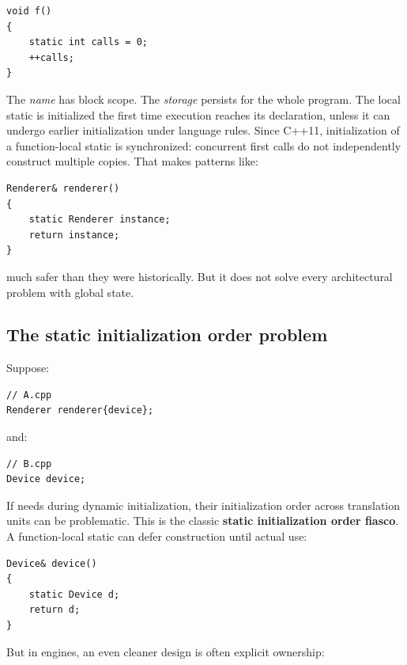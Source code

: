 \begin{verbatim}
void f()
{
    static int calls = 0;
    ++calls;
}
\end{verbatim}

The \emph{name}  has block scope. The \emph{storage} persists for the whole program. The local static is initialized the first time execution reaches its declaration, unless it can undergo earlier initialization under language rules. Since C++11, initialization of a function-local static is synchronized: concurrent first calls do not independently construct multiple copies. That makes patterns like:

\begin{verbatim}
Renderer& renderer()
{
    static Renderer instance;
    return instance;
}
\end{verbatim}

much safer than they were historically. But it does not solve every architectural problem with global state.

\subsection{The static initialization order problem}\label{05-engine-i-ch002-the-static-initialization-order-problem}

\hypertarget{05-engine-i-ch002-the-static-initialization-order-problem}{}

Suppose:

\begin{verbatim}
// A.cpp
Renderer renderer{device};
\end{verbatim}

and:

\begin{verbatim}
// B.cpp
Device device;
\end{verbatim}

If  needs  during dynamic initialization, their initialization order across translation units can be problematic. This is the classic \textbf{static initialization order fiasco}. A function-local static can defer construction until actual use:

\begin{verbatim}
Device& device()
{
    static Device d;
    return d;
}
\end{verbatim}

But in engines, an even cleaner design is often explicit ownership:

